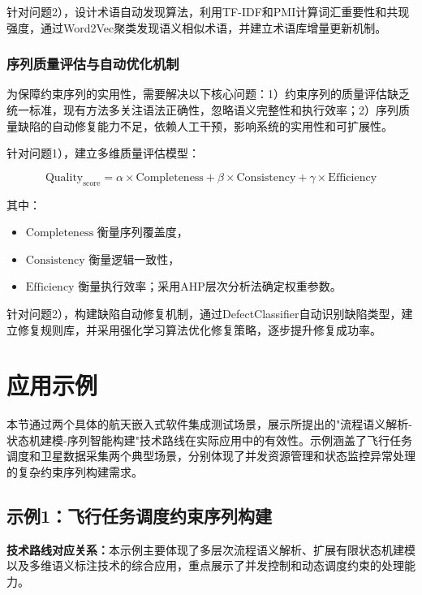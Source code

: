 \documentclass[fontset=windows]{article}
\begin{document}
针对问题2），设计术语自动发现算法，利用TF-IDF和PMI计算词汇重要性和共现强度，通过Word2Vec聚类发现语义相似术语，并建立术语库增量更新机制。

\subsubsection{序列质量评估与自动优化机制}

为保障约束序列的实用性，需要解决以下核心问题：1）约束序列的质量评估缺乏统一标准，现有方法多关注语法正确性，忽略语义完整性和执行效率；2）序列质量缺陷的自动修复能力不足，依赖人工干预，影响系统的实用性和可扩展性。

针对问题1），建立多维质量评估模型：

\begin{equation}
\text{Quality}_{\text{score}} = \alpha \times \text{Completeness} + \beta \times \text{Consistency} + \gamma \times \text{Efficiency}
\end{equation}

其中：
\begin{itemize}
    \item $\text{Completeness}$ 衡量序列覆盖度，
    \item $\text{Consistency}$ 衡量逻辑一致性，
    \item $\text{Efficiency}$ 衡量执行效率；采用AHP层次分析法确定权重参数。
\end{itemize}

针对问题2），构建缺陷自动修复机制，通过DefectClassifier自动识别缺陷类型，建立修复规则库，并采用强化学习算法优化修复策略，逐步提升修复成功率。

\section{应用示例}

本节通过两个具体的航天嵌入式软件集成测试场景，展示所提出的"流程语义解析-状态机建模-序列智能构建"技术路线在实际应用中的有效性。示例涵盖了飞行任务调度和卫星数据采集两个典型场景，分别体现了并发资源管理和状态监控异常处理的复杂约束序列构建需求。

\subsection{示例1：飞行任务调度约束序列构建}

\textbf{技术路线对应关系：}本示例主要体现了多层次流程语义解析、扩展有限状态机建模以及多维语义标注技术的综合应用，重点展示了并发控制和动态调度约束的处理能力。
\end{document}
